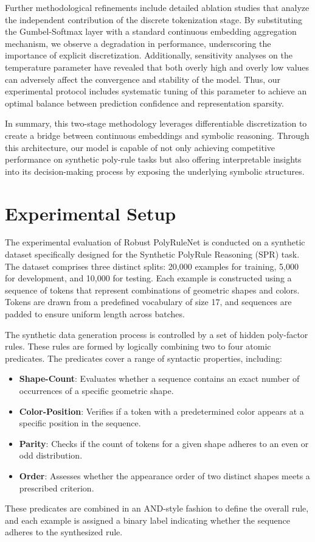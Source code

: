 \documentclass[11pt]{article}
\begin{document}
Further methodological refinements include detailed ablation studies that analyze the independent contribution of the discrete tokenization stage. By substituting the Gumbel-Softmax layer with a standard continuous embedding aggregation mechanism, we observe a degradation in performance, underscoring the importance of explicit discretization. Additionally, sensitivity analyses on the temperature parameter have revealed that both overly high and overly low values can adversely affect the convergence and stability of the model. Thus, our experimental protocol includes systematic tuning of this parameter to achieve an optimal balance between prediction confidence and representation sparsity.

In summary, this two-stage methodology leverages differentiable discretization to create a bridge between continuous embeddings and symbolic reasoning. Through this architecture, our model is capable of not only achieving competitive performance on synthetic poly-rule tasks but also offering interpretable insights into its decision-making process by exposing the underlying symbolic structures.

\section{Experimental Setup}
The experimental evaluation of Robust PolyRuleNet is conducted on a synthetic dataset specifically designed for the Synthetic PolyRule Reasoning (SPR) task. The dataset comprises three distinct splits: 20,000 examples for training, 5,000 for development, and 10,000 for testing. Each example is constructed using a sequence of tokens that represent combinations of geometric shapes and colors. Tokens are drawn from a predefined vocabulary of size 17, and sequences are padded to ensure uniform length across batches.

The synthetic data generation process is controlled by a set of hidden poly-factor rules. These rules are formed by logically combining two to four atomic predicates. The predicates cover a range of syntactic properties, including:
\begin{itemize}
    \item \textbf{Shape-Count}: Evaluates whether a sequence contains an exact number of occurrences of a specific geometric shape.
    \item \textbf{Color-Position}: Verifies if a token with a predetermined color appears at a specific position in the sequence.
    \item \textbf{Parity}: Checks if the count of tokens for a given shape adheres to an even or odd distribution.
    \item \textbf{Order}: Assesses whether the appearance order of two distinct shapes meets a prescribed criterion.
\end{itemize}
These predicates are combined in an AND-style fashion to define the overall rule, and each example is assigned a binary label indicating whether the sequence adheres to the synthesized rule.
\end{document}
